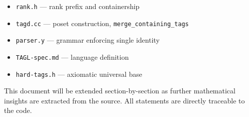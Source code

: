 \documentclass[11pt,a4paper]{article}
\begin{document}
\begin{itemize}
    \item \texttt{rank.h} — rank prefix and containership
    \item \texttt{tagd.cc} — poset construction, \texttt{merge\_containing\_tags}
    \item \texttt{parser.y} — grammar enforcing single identity
    \item \texttt{TAGL-spec.md} — language definition
    \item \texttt{hard-tags.h} — axiomatic universal base
\end{itemize}

This document will be extended section-by-section as further mathematical insights are extracted from the source. All statements are directly traceable to the code.
\end{document}
